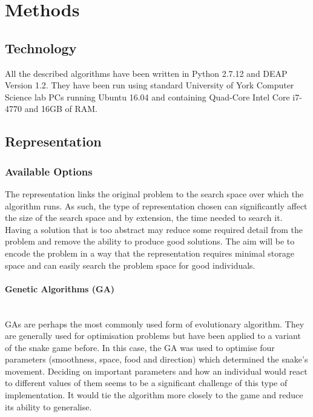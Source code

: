 \documentclass{article}
\newcommand{\myparagraph}[1]{\paragraph{#1}\mbox{}\\}
\begin{document}
\section{Methods} %
\subsection{Technology}
All the described algorithms have been written in Python 2.7.12 and DEAP Version 1.2. They have been run using standard University of York Computer Science lab PCs running Ubuntu 16.04 and containing Quad-Core Intel Core i7-4770 and 16GB of RAM.

\subsection{Representation}
\subsubsection{Available Options}
The representation links the original problem to the search space over which the algorithm runs. As such, the type of representation chosen can significantly affect the size of the search space and by extension, the time needed to search it. Having a solution that is too abstract may reduce some required detail from the problem and remove the ability to produce good solutions. %
The aim will be to encode the problem in a way that the representation requires minimal storage space and can easily search the problem space for good individuals. 

\myparagraph{Genetic Algorithms (GA)}
GAs are perhaps the most commonly used form of evolutionary algorithm. They are generally used for optimisation problems but have been applied to a variant of the snake game before\cite{snake_paper}. In this case, the GA was used to optimise four parameters (smoothness, space, food and direction) which determined the snake's movement. Deciding on important parameters and how an individual would react to different values of them seems to be a significant challenge of this type of implementation. It would tie the algorithm more closely to the game and reduce its ability to generalise.
\end{document}
